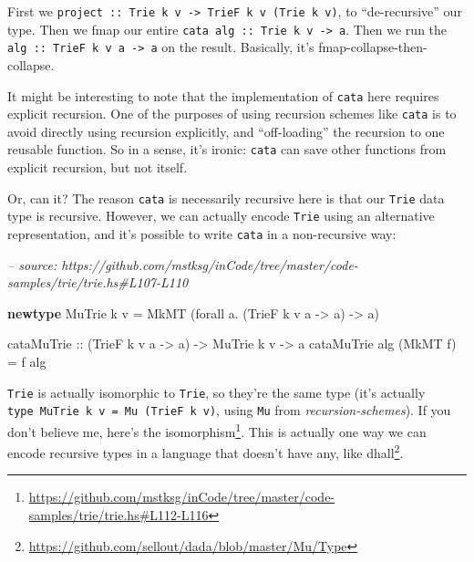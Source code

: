 \documentclass[]{article}
\newenvironment{Shaded}{}{}
\newcommand{\CommentTok}[1]{\textcolor[rgb]{0.38,0.63,0.69}{\textit{#1}}}
\newcommand{\DataTypeTok}[1]{\textcolor[rgb]{0.56,0.13,0.00}{#1}}
\newcommand{\FunctionTok}[1]{\textcolor[rgb]{0.02,0.16,0.49}{#1}}
\newcommand{\KeywordTok}[1]{\textcolor[rgb]{0.00,0.44,0.13}{\textbf{#1}}}
\newcommand{\NormalTok}[1]{#1}
\newcommand{\OtherTok}[1]{\textcolor[rgb]{0.00,0.44,0.13}{#1}}
\renewcommand{\href}[2]{#2\footnote{\url{#1}}}
\begin{document}
First we
\texttt{project\ ::\ Trie\ k\ v\ -\textgreater{}\ TrieF\ k\ v\ (Trie\ k\ v)}, to
``de-recursive'' our type. Then we fmap our entire
\texttt{cata\ alg\ ::\ Trie\ k\ v\ -\textgreater{}\ a}. Then we run the
\texttt{alg\ ::\ TrieF\ k\ v\ a\ -\textgreater{}\ a} on the result. Basically,
it's fmap-collapse-then-collapse.

It might be interesting to note that the implementation of
\texttt{cata\textquotesingle{}} here requires explicit recursion. One of the
purposes of using recursion schemes like \texttt{cata} is to avoid directly
using recursion explicitly, and ``off-loading'' the recursion to one reusable
function. So in a sense, it's ironic: \texttt{cata} can save other functions
from explicit recursion, but not itself.

Or, can it? The reason \texttt{cata\textquotesingle{}} is necessarily recursive
here is that our \texttt{Trie} data type is recursive. However, we can actually
encode \texttt{Trie} using an alternative representation, and it's possible to
write \texttt{cata\textquotesingle{}} in a non-recursive way:

\begin{Shaded}
\begin{Highlighting}[]
\CommentTok{-- source: https://github.com/mstksg/inCode/tree/master/code-samples/trie/trie.hs#L107-L110}

\KeywordTok{newtype} \DataTypeTok{MuTrie}\NormalTok{ k v }\FunctionTok{=} \DataTypeTok{MkMT}\NormalTok{ (forall a}\FunctionTok{.}\NormalTok{ (}\DataTypeTok{TrieF}\NormalTok{ k v a }\OtherTok{->}\NormalTok{ a) }\OtherTok{->}\NormalTok{ a)}

\OtherTok{cataMuTrie ::}\NormalTok{ (}\DataTypeTok{TrieF}\NormalTok{ k v a }\OtherTok{->}\NormalTok{ a) }\OtherTok{->} \DataTypeTok{MuTrie}\NormalTok{ k v }\OtherTok{->}\NormalTok{ a}
\NormalTok{cataMuTrie alg (}\DataTypeTok{MkMT}\NormalTok{ f) }\FunctionTok{=}\NormalTok{ f alg}
\end{Highlighting}
\end{Shaded}

\texttt{Trie\textquotesingle{}} is actually isomorphic to \texttt{Trie}, so
they're the same type (it's actually
\texttt{type\ MuTrie\ k\ v\ =\ Mu\ (TrieF\ k\ v)}, using \texttt{Mu} from
\emph{recursion-schemes}). If you don't believe me,
\href{https://github.com/mstksg/inCode/tree/master/code-samples/trie/trie.hs\#L112-L116}{here's
the isomorphism}. This is actually one way we can encode recursive types in a
language that doesn't have any, like
\href{https://github.com/sellout/dada/blob/master/Mu/Type}{dhall}.
\end{document}
